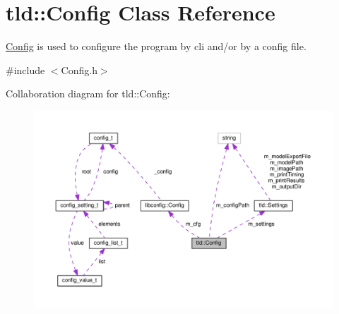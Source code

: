 \hypertarget{classtld_1_1Config}{\section{tld\-:\-:Config Class Reference}
\label{classtld_1_1Config}
}


\hyperlink{classtld_1_1Config}{Config} is used to configure the program by cli and/or by a config file.  




{\ttfamily \#include $<$Config.\-h$>$}



Collaboration diagram for tld\-:\-:Config\-:\nopagebreak
\begin{figure}[H]
\begin{center}
\leavevmode
\includegraphics[width=350pt]{classtld_1_1Config__coll__graph}
\end{center}
\end{figure}

